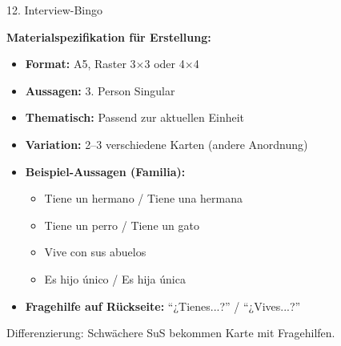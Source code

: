 \documentclass[11pt, a4paper]{article}
\begin{document}
\begin{methode}{12. Interview-Bingo}
\begin{materialbox}
\textbf{Materialspezifikation für Erstellung:}
\begin{itemize}[leftmargin=*]
    \item \textbf{Format:} A5, Raster 3$\times$3 oder 4$\times$4
    \item \textbf{Aussagen:} 3. Person Singular
    \item \textbf{Thematisch:} Passend zur aktuellen Einheit
    \item \textbf{Variation:} 2--3 verschiedene Karten (andere Anordnung)
    \item \textbf{Beispiel-Aussagen (Familia):}
    \begin{itemize}
        \item Tiene un hermano / Tiene una hermana
        \item Tiene un perro / Tiene un gato
        \item Vive con sus abuelos
        \item Es hijo único / Es hija única
    \end{itemize}
    \item \textbf{Fragehilfe auf Rückseite:} ``¿Tienes...?'' / ``¿Vives...?''
\end{itemize}
\end{materialbox}

\begin{tipp}
Differenzierung: Schwächere SuS bekommen Karte mit Fragehilfen.
\end{tipp}

\end{methode}

\vspace{1em}
\end{document}
